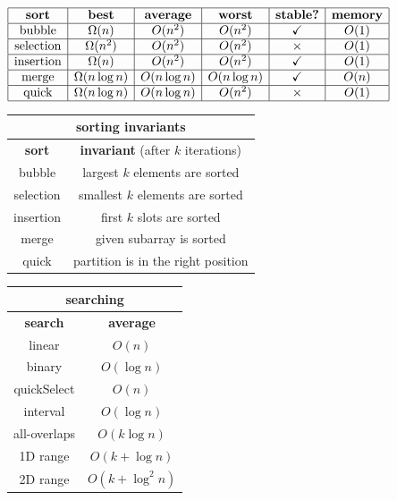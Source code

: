 \documentclass[10pt, landscape]{article}
\newenvironment{tightcenter}{%
  \setlength\topsep{0pt}
  \setlength\parskip{0pt}
  \begin{center}
}{%
  \end{center}
}
\begin{document}
\hrulefill \\

\begin{multicols}{3}
    \begin{tightcenter}
        $
        \begin{array}{| c | c | c | c | c | c |}
            \hline\textbf{sort} & \textbf{best} & \textbf{average} & \textbf{worst} & \textbf{stable?} & \textbf{memory}
    
            \\\hline\text{bubble} & \Omega(n) & O(n^2) & O(n^2) & \checkmark & O(1)
            
            \\\hline\text{selection} & \Omega(n^2) & O(n^2) & O(n^2) & \times & O(1)
            
            \\\hline\text{insertion} & \Omega(n) & O(n^2) & O(n^2) & \checkmark & O(1)
            
            \\\hline\text{merge} & \Omega(n\log n) & O(n\log n) & O(n\log n) & \checkmark & O(n)
            
            \\\hline\text{quick} & \Omega(n\log n) & O(n\log n) & O(n^2) & \times & O(1)
            \\\hline
        \end{array} 
        $\
        \begin{tabular}{| c | c |}
            \multicolumn{2}{c}{sorting invariants}
            \\\hline\textbf{sort} & \textbf{invariant} (after $k$ iterations)
            \\\hline bubble & largest $k$ elements are sorted
            \\\hline selection & smallest $k$ elements are sorted
            \\\hline insertion & first $k$ slots are sorted
            \\\hline merge & given subarray is sorted
            \\\hline quick & partition is in the right position
            \\\hline
        \end{tabular} \begin{tabular}{| c | c |}
            \multicolumn{2}{c}{searching}\\\hline
            \textbf{search} & \textbf{average} \\\hline
            linear & $O(n)$ \\\hline
            binary & $O(\log n)$ \\\hline
            quickSelect & $O(n)$ \\\hline
            interval & $O(\log n)$ \\\hline
            all-overlaps & $O(k\log n)$ \\\hline
            1D range & $O(k + \log n)$ \\\hline
            2D range & $O(k + \log^2 n)$ \\\hline
        \end{tabular}
        

\end{tightcenter}
\end{multicols}
\end{document}
